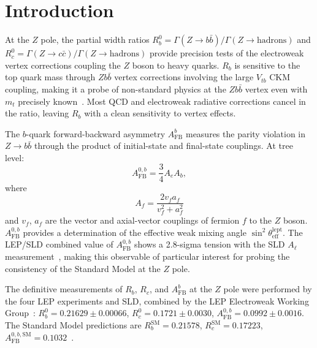 \documentclass[11pt,a4paper]{article}
\begin{document}
\clearpage

\FloatBarrier
{}
\section{Introduction}
\label{sec:intro}

At the $Z$ pole, the partial width ratios $R_b^0 = \Gamma(Z \to b\bar{b})/\Gamma(Z \to \mathrm{hadrons})$
and $R_c^0 = \Gamma(Z \to c\bar{c})/\Gamma(Z \to \mathrm{hadrons})$ provide precision tests of
the electroweak vertex corrections coupling the $Z$ boson to heavy quarks.
$R_b$ is sensitive to the top quark mass through $Zb\bar{b}$ vertex corrections involving
the large $V_{tb}$ CKM coupling, making it a probe of non-standard physics at the
$Zb\bar{b}$ vertex even with $m_t$ precisely known~\cite{ALEPH:Rb:1996, LEP:EWWG:2005}.
Most QCD and electroweak radiative corrections cancel in the ratio, leaving $R_b$
with a clean sensitivity to vertex effects.

The $b$-quark forward-backward asymmetry $A_\mathrm{FB}^b$ measures the parity violation
in $Z \to b\bar{b}$ through the product of initial-state and final-state couplings.
At tree level:
\begin{equation}
A_\mathrm{FB}^{0,b} = \frac{3}{4} A_e A_b,
\label{eq:afb_tree}
\end{equation}
where
\begin{equation}
A_f = \frac{2 v_f a_f}{v_f^2 + a_f^2}
\label{eq:asymmetry_param}
\end{equation}
and $v_f$, $a_f$ are the vector and axial-vector couplings of fermion $f$ to the $Z$ boson.
$A_\mathrm{FB}^{0,b}$ provides a determination of the effective weak mixing angle
$\sin^2\theta_\mathrm{eff}^\mathrm{lept}$.  The LEP/SLD combined value of $A_\mathrm{FB}^{0,b}$
shows a 2.8-sigma tension with the SLD $A_\ell$ measurement~\cite{LEP:EWWG:2005},
making this observable of particular interest for probing the consistency of the
Standard Model at the $Z$ pole.

The definitive measurements of $R_b$, $R_c$, and $A_\mathrm{FB}^b$ at the $Z$ pole
were performed by the four LEP experiments and SLD, combined by the LEP Electroweak
Working Group~\cite{LEP:EWWG:2005}:
$R_b^0 = 0.21629 \pm 0.00066$,
$R_c^0 = 0.1721 \pm 0.0030$,
$A_\mathrm{FB}^{0,b} = 0.0992 \pm 0.0016$.
The Standard Model predictions are
$R_b^\mathrm{SM} = 0.21578$,
$R_c^\mathrm{SM} = 0.17223$,
$A_\mathrm{FB}^{0,b,\mathrm{SM}} = 0.1032$~\cite{LEP:EWWG:2005}.
\end{document}
